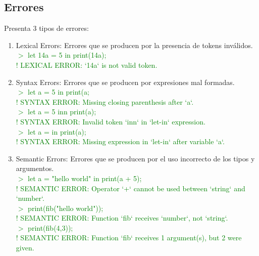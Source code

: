 \documentclass[a4paper,12pt]{article}
\begin{document}
    \subsection{Errores}\label{sub:errors}
    \begin{flushleft}
        Presenta 3 tipos de errores:
        \begin{enumerate}
            \item Lexical Errors: Errores que se producen por la presencia de tokens inválidos.\\
            \textcolor{green}{$>$ let 14a = 5 in print(14a);}\\
            \textcolor{green}{! LEXICAL ERROR: `14a` is not valid token.}
            \\
            \item Syntax Errors: Errores que se producen por expresiones mal formadas.\\
            \textcolor{green}{$>$ let a = 5 in print(a;}\\
            \textcolor{green}{! SYNTAX ERROR: Missing closing parenthesis after `a`.}\\

            \textcolor{green}{$>$ let a = 5 inn print(a);}\\
            \textcolor{green}{! SYNTAX ERROR: Invalid token `inn` in `let-in` expression.}\\

            \textcolor{green}{$>$ let a = in print(a);}\\
            \textcolor{green}{! SYNTAX ERROR: Missing expression in `let-in` after variable `a`.}\\

            \newpage
            \item Semantic Errors: Errores que se producen por el uso incorrecto de los tipos y argumentos.\\
            \textcolor{green}{$>$ let a = "hello world" in print(a + 5);}\\
            \textcolor{green}{! SEMANTIC ERROR: Operator `+` cannot be used between `string` and `number`.}\\

            \textcolor{green}{$>$ print(fib("hello world"));}\\
            \textcolor{green}{! SEMANTIC ERROR: Function `fib` receives `number`, not `string`.}\\
            
            \textcolor{green}{$>$  print(fib(4,3));}\\
            \textcolor{green}{! SEMANTIC ERROR: Function `fib` receives 1 argument(s), but 2 were given.}\\
        \end{enumerate}
    \end{flushleft}
\end{document}

